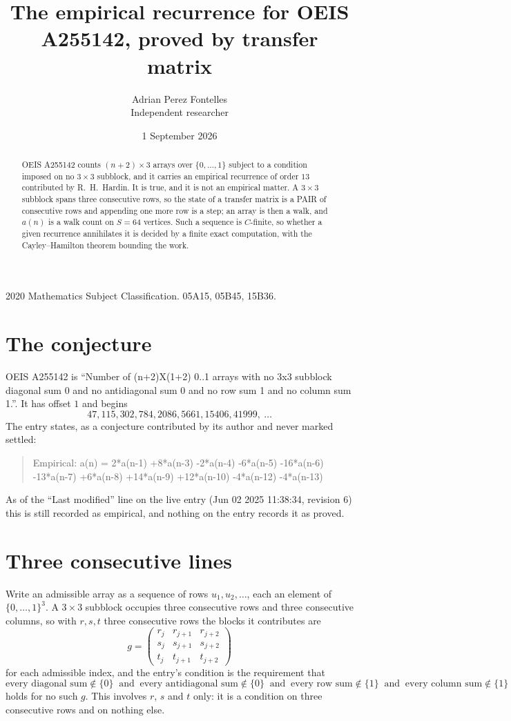 \documentclass[11pt,a4paper]{article}
\title{The empirical recurrence for OEIS A255142, proved by transfer matrix}
\author{Adrian Perez Fontelles\\ \small Independent researcher}
\date{1 September 2026}
\theoremstyle{plain}
\theoremstyle{definition}
\begin{document}
\maketitle

\begin{abstract}
OEIS A255142 counts $(n+2)\times3$ arrays over $\{0,\dots,1\}$ subject to a condition imposed on
no $3\times3$ subblock, and it carries an empirical recurrence of order $13$
contributed by R.~H.~Hardin. It is true, and it is not an empirical matter. A $3\times3$
subblock spans three consecutive rows, so the state of a transfer matrix is a PAIR of
consecutive rows and appending one more row is a step; an array is then a walk, and
$a(n)$ is a walk count on $S=64$ vertices. Such a sequence is $C$-finite, so whether a given
recurrence annihilates it is decided by a finite exact computation, with the Cayley--Hamilton
theorem bounding the work.
\end{abstract}

\noindent\small 2020 Mathematics Subject Classification. 05A15, 05B45, 15B36.\normalsize

\section{The conjecture}

OEIS A255142 is ``Number of (n+2)X(1+2) 0..1 arrays with no 3x3 subblock diagonal sum 0 and no antidiagonal sum 0 and no row sum 1 and no column sum 1.''. It has offset $1$ and begins
\[
47, 115, 302, 784, 2086, 5661, 15406, 41999,\ \dots
\]
The entry states, as a conjecture contributed by its author and never marked settled:
\begin{quote}
Empirical: a(n) = 2*a(n-1) +8*a(n-3) -2*a(n-4) -6*a(n-5) -16*a(n-6) -13*a(n-7) +6*a(n-8) +14*a(n-9) +12*a(n-10) -4*a(n-12) -4*a(n-13)
\end{quote}
As of the ``Last modified'' line on the live entry (Jun 02 2025 11:38:34, revision 6) this is still
recorded as empirical, and nothing on the entry records it as proved.

\section{Three consecutive lines}

Write an admissible array as a sequence of rows $u_1,u_2,\dots$, each an element of
$\{0,\dots,1\}^{3}$. A $3\times3$ subblock occupies three consecutive rows and
three consecutive columns, so with $r,s,t$ three consecutive rows the blocks it
contributes are
\[
g=\begin{pmatrix}r_j&r_{j+1}&r_{j+2}\\ s_j&s_{j+1}&s_{j+2}\\ t_j&t_{j+1}&t_{j+2}\end{pmatrix}
\]
for each admissible index, and the entry's condition is the requirement that
\[
\text{every diagonal sum} \notin \{0\}\ \text{ and }\ \text{every antidiagonal sum} \notin \{0\}\ \text{ and }\ \text{every row sum} \notin \{1\}\ \text{ and }\ \text{every column sum} \notin \{1\}
\]
holds for no such $g$. This involves $r$, $s$ and $t$ only: it is a condition on
three consecutive rows and on nothing else.
\end{document}
